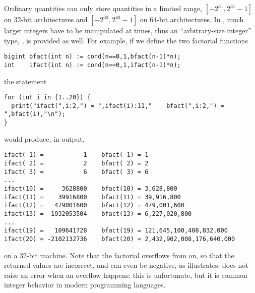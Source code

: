 Ordinary  quantities can only store quantities in a limited
range, $[-2^{31},2^{31}-1]$ on 32-bit architectures
and $[-2^{63}, 2^{63}-1]$ on 64-bit architectures.
In \smart, much larger integers have to be manipulated at times,
thus an ``arbitrary-size integer'' type, , is provided as well.
For example, if we define the two factorial functions
\begin{lstlisting}
bigint bfact(int n) := cond(n==0,1,bfact(n-1)*n);
int    ifact(int n) := cond(n==0,1,ifact(n-1)*n);
\end{lstlisting}
the  statement
\begin{lstlisting}
for (int i in {1..20}) {
  print("ifact(",i:2,") = ",ifact(i):11,"    bfact(",i:2,") = ",bfact(i),"\n");
}
\end{lstlisting}
would produce, in output,
\begin{lstlisting}
ifact( 1) =           1    bfact( 1) = 1
ifact( 2) =           2    bfact( 2) = 2
ifact( 3) =           6    bfact( 3) = 6
...
ifact(10) =     3628800    bfact(10) = 3,628,800
ifact(11) =    39916800    bfact(11) = 39,916,800
ifact(12) =   479001600    bfact(12) = 479,001,600
ifact(13) =  1932053504    bfact(13) = 6,227,020,800
...
ifact(19) =   109641728    bfact(19) = 121,645,100,408,832,000
ifact(20) = -2102132736    bfact(20) = 2,432,902,008,176,640,000
\end{lstlisting}
on a 32-bit machine.
Note that the  factorial overflows from  on,
so that the returned values are incorrect, and can even be negative,
as  illustrates.
{\smart} does not raise an error when an overflow happens:
this is unfortunate, but it is common integer behavior
in modern programming languages.

